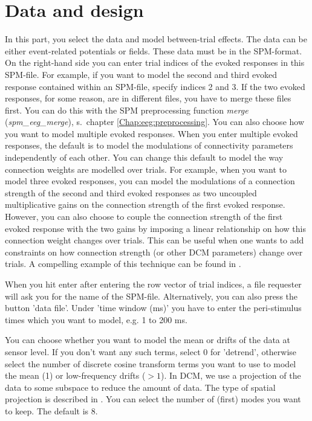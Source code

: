 \section{Data and design}
In this part, you select the data and model between-trial
effects. The data can be either event-related 
potentials or fields. These data must be in the SPM-format. On the
right-hand side you can enter trial indices of the evoked responses in
this SPM-file. For example, if you want to model the
second and third evoked response contained within an SPM-file, specify
indices 2 and 3. If the two evoked responses, for some reason, are in
different files, you have to merge these files first. You can do this
with the SPM preprocessing function \textit{merge}
(\textit{spm\_eeg\_merge}), s.~chapter
\ref{Chap:eeg:preprocessing}. You can also choose how you want to
model multiple evoked responses. When you enter multiple evoked
responses, the default is to model the modulations of connectivity
parameters independently of each other. You can change this default to
model the way connection weights are modelled over trials. For
example, when you want to model three evoked responses, you can model
the modulations of a connection strength of the second and third
evoked responses as two uncoupled multiplicative gains on the connection
strength of the first evoked response. However, you can also choose to
couple the connection strength of the first evoked response with the
two gains by imposing a linear relationship on how this connection
weight changes over trials. This can be useful when one wants to add
constraints on how connection strength (or other DCM parameters)
change over trials. A compelling example of this technique can be
found in \cite{marta_mmndcm}.

When you hit enter after entering the
row vector of trial indices, a file requester will ask you for the
name of the SPM-file. Alternatively, you can also press the button
'data file'. Under 'time window (ms)' you have to enter the
peri-stimulus times which you want to model, e.g. 1 to 200 ms. 

You can choose whether you want to model the mean or
drifts of the data at sensor level. If you don't want any such terms,
select 0 for 'detrend', otherwise select the number of discrete cosine
transform terms you want to use to model the mean (1) or low-frequency
drifts ($> 1$). In DCM, we use a projection of the data to some
subspace to reduce the amount of data. The type of spatial projection
is described in \cite{matthias_dcm_constraints}. You can select the
number of (first) modes you want to keep. The default is 8.


